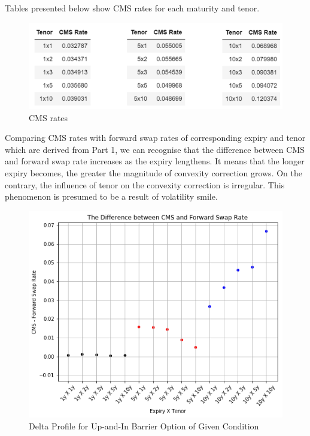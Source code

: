 \documentclass{article}
\begin{document}
Tables presented below show CMS rates for each maturity and tenor. 

\begin{figure}[h]
	\centering
	\includegraphics[scale=0.40]{CMS_RATE.png}
	\caption{CMS rates}
\end{figure}

\noindent Comparing CMS rates with forward swap rates of corresponding expiry and tenor which are derived from Part 1, we can recognise that the difference between CMS and forward swap rate increases as the expiry lengthens. It means that the longer expiry becomes, the greater the magnitude of convexity correction grows. On the contrary, the influence of tenor on the convexity correction is irregular. This phenomenon is presumed to be a result of volatility smile. 

\begin{figure}[ht]
	\centering
	\includegraphics[scale=0.45]{CMS_FSR.png}
	\caption{Delta Profile for Up-and-In Barrier Option of Given Condition}
\end{figure}

\newpage
\end{document}
